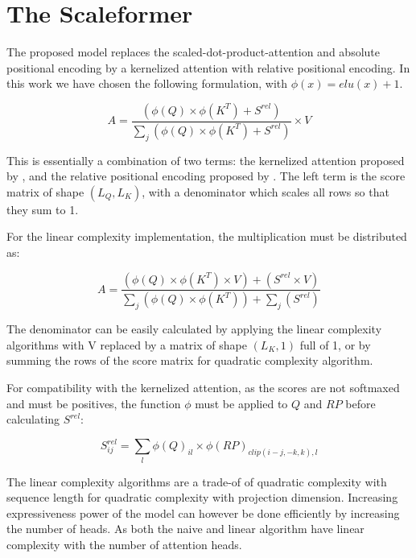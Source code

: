 \section{The Scaleformer}

The proposed model replaces the scaled-dot-product-attention  and absolute positional encoding by a kernelized attention with relative positional encoding.
In this work we have chosen the following formulation, with $\phi(x) = elu(x) + 1$.

\begin{equation}
A = \frac{\left( \phi(Q) \times \phi(K^T) + S^{rel} \right)}{\sum_j \left( \phi(Q) \times \phi(K^T) + S^{rel} \right)} \times V
\end{equation}

This is essentially a combination of two terms: the kernelized attention
proposed by  \citet{katharopoulos2020transformers}, and the relative positional encoding proposed by
\citet{shaw2018selfattention}. The left
term is the score matrix of shape $(L_Q, L_K)$, with a denominator
which scales all rows so that they sum to 1.

For the linear complexity implementation, the multiplication must be distributed as:

\begin{equation}
A = \frac{\left( \phi(Q) \times \phi(K^T) \times V \right) + \left( S^{rel} \times V\right)}{\sum_j \left( \phi(Q) \times \phi(K^T) \right) + \sum_j \left( S^{rel} \right)}
\end{equation}

The denominator can be easily calculated by applying the linear complexity algorithms with V replaced by a matrix of shape $(L_K, 1)$ full of 1, or by summing the rows of the score matrix for quadratic complexity algorithm.

For compatibility with the kernelized attention, as the scores are not softmaxed and must be positives, the function $\phi$ must be applied to $Q$ and $RP$ before calculating $S^{rel}$:

\begin{equation}
	S^{rel}_{ij} = \sum_l \phi(Q)_{il} \times \phi(RP)_{clip(i-j, -k, k), l}
\end{equation}

The linear complexity algorithms are a trade-of of quadratic complexity with sequence length for quadratic complexity with projection dimension. Increasing expressiveness power of the model can however be done efficiently by increasing the number of heads. As both the naive and linear algorithm have linear complexity with the number of attention heads.

\endinput
